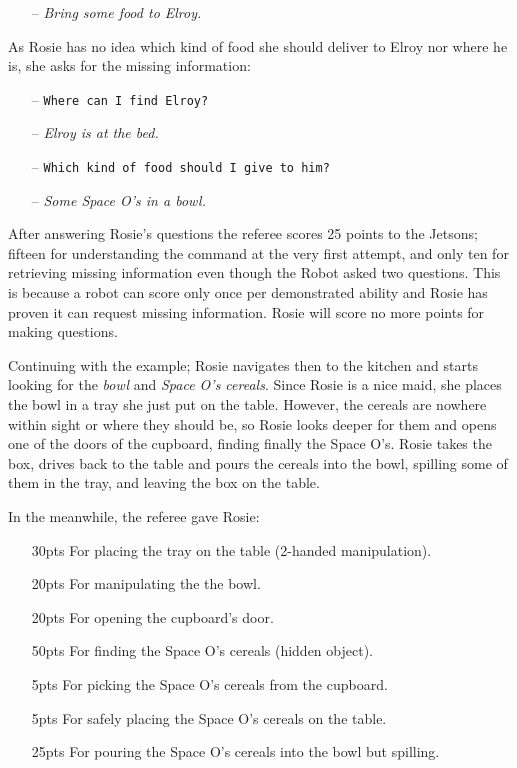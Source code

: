 \begin{itemize}
	\item[--] \textit{Bring some food to Elroy.}
\end{itemize}

As Rosie has no idea which kind of food she should deliver to Elroy nor where he is, she asks for the missing information:

\begin{itemize}
	\item[--] \texttt{Where can I find Elroy?}
	\item[--] \textit{Elroy is at the bed.}
	\item[--] \texttt{Which kind of food should I give to him?}
	\item[--] \textit{Some Space O's in a bowl.}
\end{itemize}

After answering Rosie's questions the referee scores 25 points to the Jetsons; fifteen for understanding the command at the very first attempt, and only ten for retrieving missing information even though the Robot asked two questions. This is because a robot can score only once per demonstrated ability and Rosie has proven it can request missing information. Rosie will score no more points for making questions.

Continuing with the example; Rosie navigates then to the kitchen and starts looking for the \textit{bowl} and \textit{Space O's cereals}. Since Rosie is a nice maid, she places the bowl in a tray she just put on the table. However, the cereals are nowhere within sight or where they should be, so Rosie looks deeper for them and opens one of the doors of the cupboard, finding finally the Space O's. Rosie takes the box, drives back to the table and pours the cereals into the bowl, spilling some of them in the tray, and leaving the box on the table.

In the meanwhile, the referee gave Rosie:
\begin{itemize}
	\item[30pts] For placing the tray on the table (2-handed manipulation).
	\item[20pts] For manipulating the the bowl.
	\item[20pts] For opening the cupboard's door.
	\item[50pts] For finding the Space O's cereals (hidden object).
	\item[ 5pts] For picking the Space O's cereals from the cupboard.
	\item[ 5pts] For safely placing the Space O's cereals on the table.
	\item[25pts] For pouring the Space O's cereals into the bowl but spilling.
\end{itemize}

